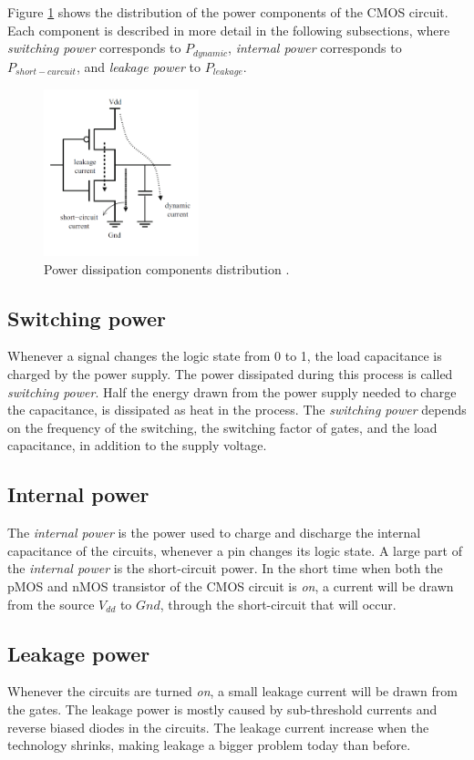 Figure \cref{fig:powerdisscmos} shows the distribution of the power components of the CMOS circuit. Each component is described in more detail in the following subsections, where \textit{switching power} corresponds to $P_{dynamic}$, \textit{internal power} corresponds to $P_{short-curcuit}$, and \textit{leakage power} to $P_{leakage}$.
\begin{figure}[hbpt]
\centering
\includegraphics[width=0.4\textwidth]{../figs/PowerDissipation.png}
\caption{\label{fig:powerdisscmos}Power dissipation components distribution \cite{panda2010power}.}
\end{figure}

\subsection{Switching power}
Whenever a signal changes the logic state from 0 to 1, the load capacitance is charged by the power supply. The power dissipated during this process is called \textit{switching power}. Half the energy drawn from the power supply needed to charge the capacitance, is dissipated as heat in the process. The \textit{switching power} depends on the frequency of the switching, the switching factor of gates, and the load capacitance, in addition to the supply voltage. 

\subsection{Internal power}
The \textit{internal power} is the power used to charge and discharge the internal capacitance of the circuits, whenever a pin changes its logic state. A large part of the \textit{internal power} is the short-circuit power. In the short time when both the pMOS and nMOS transistor of the CMOS circuit is \textit{on}, a current will be drawn from the source $V_{dd}$ to $Gnd$, through the short-circuit that will occur. 

\subsection{Leakage power}
Whenever the circuits are turned \textit{on}, a small leakage current will be drawn from the gates. The leakage power is mostly caused by sub-threshold currents and reverse biased diodes in the circuits. The leakage current increase when the technology shrinks, making leakage a bigger problem today than before. 

